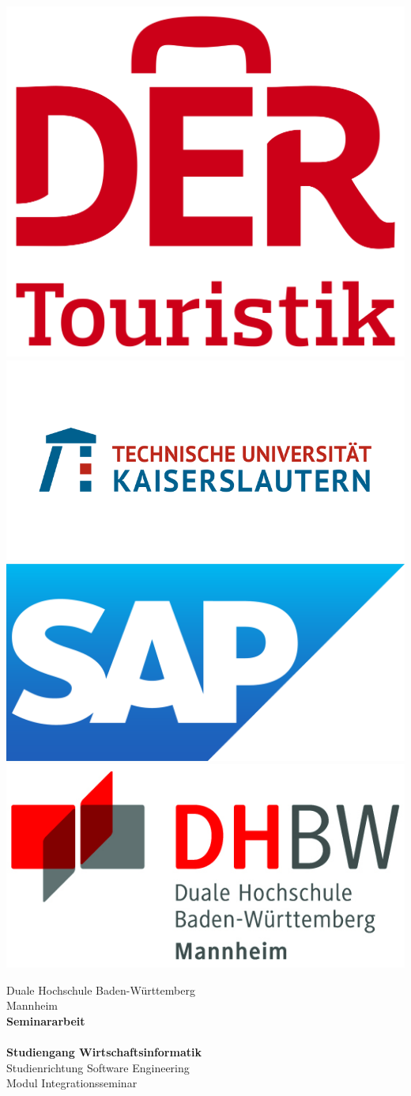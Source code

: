 \begin{titlepage}

\begin{minipage}{\textwidth}
	\vspace{-2cm}
	\noindent
	\includegraphics[height=0.1\linewidth]{img/logos/der}
	\hfill
	\includegraphics[height=0.1\linewidth]{img/logos/tukl}
	\hfill
	\includegraphics[height=0.1\linewidth]{img/logos/sap}
	\hfill
	\includegraphics[height=0.1\linewidth]{img/logos/dhbw}
\end{minipage}

\vspace{0em}
\sffamily

\begin{center}
	\textsf{\large{}Duale Hochschule Baden-Württemberg\\[1.5mm] Mannheim}\\[2em]
	\textsf{\textbf{\Large{}Seminararbeit}}\\[3mm]
	\textsf{\textbf{\DerTitelDerArbeit}}\\[1cm]
	\textsf{\textbf{\Large{}Studiengang Wirtschaftsinformatik}\\[1mm] \textsf{Studienrichtung Software Engineering}\\[1mm]
	\textsf{Modul Integrationsseminar}}

	\vspace{2em}
	\vfill

	\begin{minipage}{\textwidth}


\end{minipage}
\end{center}
\end{titlepage}
